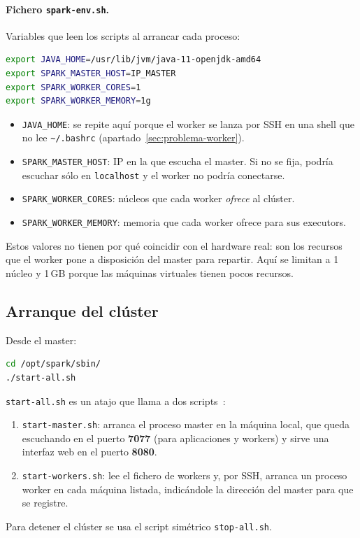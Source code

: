 \documentclass[11pt,a4paper]{article}
\begin{document}
\paragraph{Fichero \texttt{spark-env.sh}.} Variables que leen los scripts al arrancar cada proceso:
\begin{lstlisting}[language=bash]
export JAVA_HOME=/usr/lib/jvm/java-11-openjdk-amd64
export SPARK_MASTER_HOST=IP_MASTER
export SPARK_WORKER_CORES=1
export SPARK_WORKER_MEMORY=1g
\end{lstlisting}

\begin{itemize}
  \item \texttt{JAVA\_HOME}: se repite aquí porque el worker se lanza por SSH en una shell que no lee \texttt{\textasciitilde/.bashrc} (apartado~\ref{sec:problema-worker}).
  \item \texttt{SPARK\_MASTER\_HOST}: IP en la que escucha el master. Si no se fija, podría escuchar sólo en \texttt{localhost} y el worker no podría conectarse.
  \item \texttt{SPARK\_WORKER\_CORES}: núcleos que cada worker \emph{ofrece} al clúster.
  \item \texttt{SPARK\_WORKER\_MEMORY}: memoria que cada worker ofrece para sus executors.
\end{itemize}
Estos valores no tienen por qué coincidir con el hardware real: son los recursos que el worker pone a disposición del master para repartir. Aquí se limitan a 1 núcleo y 1\,GB porque las máquinas virtuales tienen pocos recursos.

\subsection{Arranque del clúster}

Desde el master:
\begin{lstlisting}[language=bash]
cd /opt/spark/sbin/
./start-all.sh
\end{lstlisting}

\texttt{start-all.sh} es un atajo que llama a dos scripts~\cite{spark-standalone}:
\begin{enumerate}
  \item \texttt{start-master.sh}: arranca el proceso master en la máquina local, que queda escuchando en el puerto \textbf{7077} (para aplicaciones y workers) y sirve una interfaz web en el puerto \textbf{8080}.
  \item \texttt{start-workers.sh}: lee el fichero de workers y, por SSH, arranca un proceso worker en cada máquina listada, indicándole la dirección del master para que se registre.
\end{enumerate}
Para detener el clúster se usa el script simétrico \texttt{stop-all.sh}.
\end{document}
